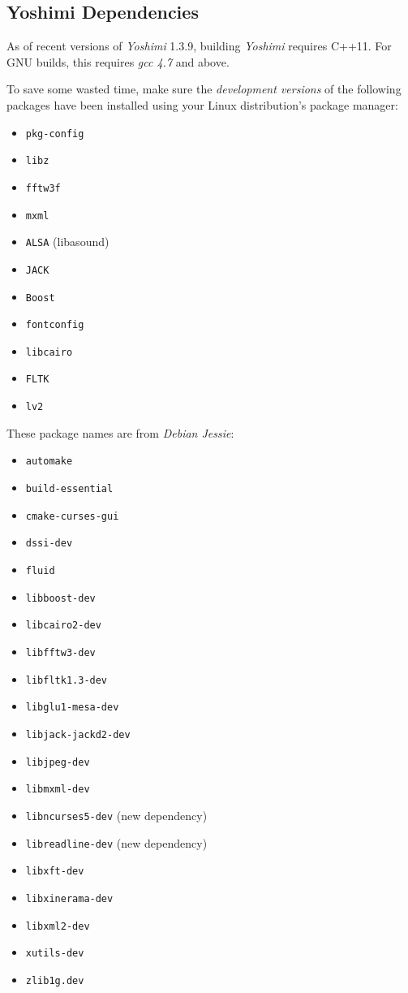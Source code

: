 \subsection{Yoshimi Dependencies}
\label{subsec:yoshimi_dependencies}

   As of recent versions of \textsl{Yoshimi} 1.3.9, building \textsl{Yoshimi}
   requires C++11.  For GNU builds, this requires \textsl{gcc 4.7} and above.

   To save some wasted time, make sure the \textsl{development versions}
   of the following packages have been installed using your Linux
   distribution's package manager:

   \begin{itemize}
      \item \texttt{pkg-config}
      \item \texttt{libz}
      \item \texttt{fftw3f}
      \item \texttt{mxml}
      \item \texttt{ALSA} (libasound)
      \item \texttt{JACK}
      \item \texttt{Boost}
      \item \texttt{fontconfig}
      \item \texttt{libcairo}
      \item \texttt{FLTK}
      \item \texttt{lv2}
   \end{itemize}

   These package names are from \textsl{Debian Jessie}:

   \begin{itemize}
      \item \texttt{automake}
      \item \texttt{build-essential}
      \item \texttt{cmake-curses-gui}
      \item \texttt{dssi-dev}
      \item \texttt{fluid}
      \item \texttt{libboost-dev}
      \item \texttt{libcairo2-dev}
      \item \texttt{libfftw3-dev}
      \item \texttt{libfltk1.3-dev}
      \item \texttt{libglu1-mesa-dev}
      \item \texttt{libjack-jackd2-dev}
      \item \texttt{libjpeg-dev}
      \item \texttt{libmxml-dev}
      \item \texttt{libncurses5-dev} (new dependency)
      \item \texttt{libreadline-dev} (new dependency)
      \item \texttt{libxft-dev}
      \item \texttt{libxinerama-dev}
      \item \texttt{libxml2-dev}
      \item \texttt{xutils-dev}
      \item \texttt{zlib1g.dev}
   \end{itemize}

